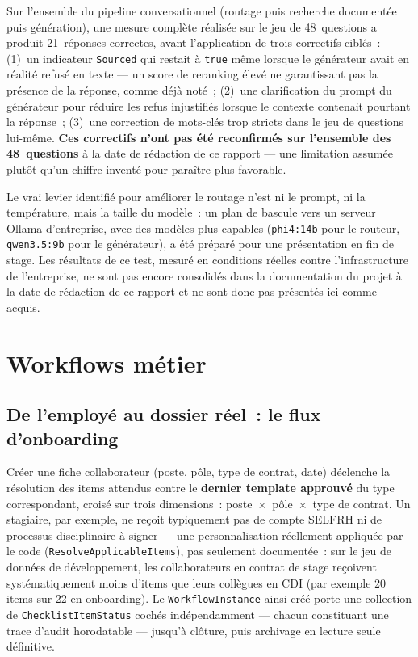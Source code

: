 \documentclass[12pt,a4paper]{article}
\newcommand{\code}[1]{\texttt{\small #1}}
\begin{document}
Sur l'ensemble du pipeline conversationnel (routage puis recherche document\'ee puis g\'en\'eration), une mesure compl\`ete r\'ealis\'ee sur le jeu de 48~questions a produit 21~r\'eponses correctes, avant l'application de trois correctifs cibl\'es~: (1)~un indicateur \code{Sourced} qui restait \`a \code{true} m\^eme lorsque le g\'en\'erateur avait en r\'ealit\'e refus\'e en texte --- un score de reranking \'elev\'e ne garantissant pas la pr\'esence de la r\'eponse, comme d\'ej\`a not\'e~; (2)~une clarification du prompt du g\'en\'erateur pour r\'eduire les refus injustifi\'es lorsque le contexte contenait pourtant la r\'eponse~; (3)~une correction de mots-cl\'es trop stricts dans le jeu de questions lui-m\^eme. \textbf{Ces correctifs n'ont pas \'et\'e reconfirm\'es sur l'ensemble des 48~questions} \`a la date de r\'edaction de ce rapport --- une limitation assum\'ee plut\^ot qu'un chiffre invent\'e pour para\^itre plus favorable.

Le vrai levier identifi\'e pour am\'eliorer le routage n'est ni le prompt, ni la temp\'erature, mais la taille du mod\`ele~: un plan de bascule vers un serveur Ollama d'entreprise, avec des mod\`eles plus capables (\code{phi4:14b} pour le routeur, \code{qwen3.5:9b} pour le g\'en\'erateur), a \'et\'e pr\'epar\'e pour une pr\'esentation en fin de stage. Les r\'esultats de ce test, mesur\'e en conditions r\'eelles contre l'infrastructure de l'entreprise, ne sont pas encore consolid\'es dans la documentation du projet \`a la date de r\'edaction de ce rapport et ne sont donc pas pr\'esent\'es ici comme acquis.

\newpage
\section{Workflows m\'etier}
\label{sec:workflows}

\subsection{De l'employ\'e au dossier r\'eel~: le flux d'onboarding}

Cr\'eer une fiche collaborateur (poste, p\^ole, type de contrat, date) d\'eclenche la r\'esolution des items attendus contre le \textbf{dernier template approuv\'e} du type correspondant, crois\'e sur trois dimensions~: poste~$\times$~p\^ole~$\times$~type de contrat. Un stagiaire, par exemple, ne re\c{c}oit typiquement pas de compte SELFRH ni de processus disciplinaire \`a signer --- une personnalisation r\'eellement appliqu\'ee par le code (\code{ResolveApplicableItems}), pas seulement document\'ee~: sur le jeu de donn\'ees de d\'eveloppement, les collaborateurs en contrat de stage re\c{c}oivent syst\'ematiquement moins d'items que leurs coll\`egues en CDI (par exemple 20 items sur 22 en onboarding). Le \code{WorkflowInstance} ainsi cr\'e\'e porte une collection de \code{ChecklistItemStatus} coch\'es ind\'ependamment --- chacun constituant une trace d'audit horodatable --- jusqu'\`a cl\^oture, puis archivage en lecture seule d\'efinitive.
\end{document}

